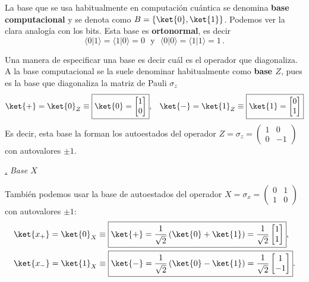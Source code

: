 \documentclass[a4paper,11pt]{book} %
\numberwithin{equation}{chapter}
\def\lp{\left(}
\def\rp{\right)}
\newcommand{\braket}[2]{\langle #1|#2\rangle}
\def\subsubiContadorIt{\par\addtocounter{subsubsection}{1}\underline{\it\thesubsubsection.}\hskip0.5cm \setcounter{subsubsubsectionIt}{0}}
\newcommand{\SubsubiIt}[1]{
		\subsubiContadorIt \textit{#1}
	}
\newcounter{subsubsubsectionIt}[subsubsection]
\begin{document}
La base que se usa habitualmente en computación cuántica se denomina \textbf{base computacional} y se denota como $B = \{ \ket{0}, \ket{1} \}$. Podemos ver la clara analogía con los bits. Esta base es \textbf{ortonormal}, es decir
	\begin{equation}
	\braket{0}{1}=\braket{1}{0}=0 ~~~ \text{y} ~~~ \braket{0}{0}=\braket{1}{1}=1\, .
	\end{equation}

Una manera de especificar una base es decir cuál es el operador que diagonaliza. A la base computacional se la suele denominar habitualmente como \textbf{base $Z$}, pues es la base que diagonaliza la matriz de Pauli $\sigma_z$
	\begin{align}
	& \ket{+} = \ket{0}_Z \equiv \boxed{\ket{0} = \begin{bmatrix}  1\\ 0\end{bmatrix}},  
	& \ket{-} = \ket{1}_Z \equiv \boxed{\ket{1} =  \begin{bmatrix}  0\\ 1\end{bmatrix}} 
	\end{align}
Es decir, esta base la forman los autoestados del operador $Z = \sigma_z = \lp \begin{matrix} 1& 0 \\ 0 & -1 \end{matrix} \rp $ con autovalores $\pm 1$. 
 
			\SubsubiIt{Base $X$} 
			
También podemos usar la base de autoestados del operador $X = \sigma_x = \lp \begin{matrix} 0 & 1 \\ 1 & 0 \end{matrix} \rp $ con autovalores $\pm 1$:
	\begin{align}
	& \ket{x_+} = \ket{0}_X \equiv \boxed{\ket{+} = \frac{1}{\sqrt{2}} \lp \ket{0} + \ket{1} \rp = \frac{1}{\sqrt{2}} \begin{bmatrix}  1 \\ 1  \end{bmatrix}}, \label{ec_qubit_x+} \\
	& \ket{x_-} = \ket{1}_X \equiv \boxed{\ket{-} =  \frac{1}{\sqrt{2}} \lp \ket{0} - \ket{1} \rp = \frac{1}{\sqrt{2}} \begin{bmatrix}  1 \\ -1  \end{bmatrix}}. \label{ec_qubit_x-}
	\end{align}
\end{document}
